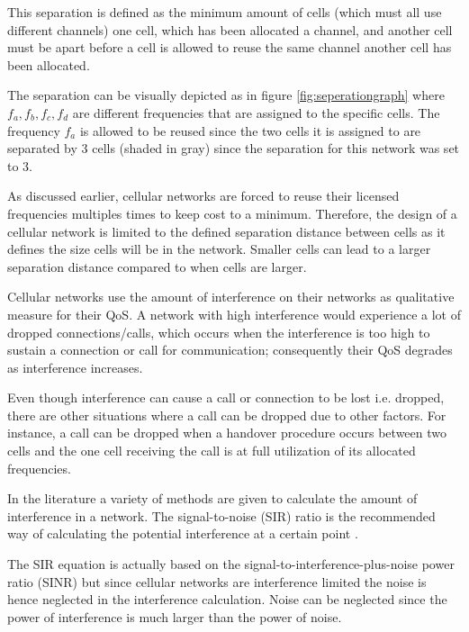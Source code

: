 This separation is defined as the minimum amount of cells (which must all use different channels) one cell, which has been allocated a channel, and another cell must be apart before a cell is allowed to reuse the same channel another cell has been allocated\cite{WirelessCommunications,WirelessDigitalCommunications,Eisenblatter,InterferenceOrientatedFAP}. 

The separation can be visually depicted as in figure \ref{fig:seperationgraph} where $f_a,f_b,f_c,f_d$ are different frequencies that are assigned to the specific cells. The frequency $f_a$ is allowed to be reused since the two cells it is assigned to are separated by 3 cells (shaded in gray) since the separation for this network was set to 3.

As discussed earlier, cellular networks are forced to reuse their licensed frequencies multiples times to keep cost to a minimum. Therefore, the design of a cellular network is limited to the defined separation distance between cells as it defines the size cells will be in the network. Smaller cells can lead to a larger separation distance compared to when cells are larger\cite{WirelessCommunications,WirelessDigitalCommunications,Eisenblatter,InterferenceOrientatedFAP}.

Cellular networks use the amount of interference on their networks as qualitative measure for their QoS. A network with high interference would experience a lot of dropped connections/calls, which occurs when the interference is too high to sustain a connection or call for communication; consequently their QoS degrades as interference increases\cite{WirelessCommunications,WirelessDigitalCommunications}.

Even though interference can cause a call or connection to be lost i.e. dropped, there are other situations where a call can be dropped due to other factors. For instance, a call can be dropped when a handover procedure occurs between two cells and the one cell receiving the call is at full utilization of its allocated frequencies\cite{GSMSysEngin,WirelessCommunications,WirelessDigitalCommunications}.

In the literature a variety of methods are given to calculate the amount of interference in a network. The signal-to-noise (SIR) ratio is the recommended way of calculating the potential interference at a certain point \cite{Karen2004}. 

The SIR equation is actually based on the signal-to-interference-plus-noise power ratio (SINR) but since cellular networks are interference limited the noise is hence neglected in the interference calculation\cite{WirelessCommunications}. Noise can be neglected since the power of interference is much larger than the power of noise\cite{WirelessCommunications,WirelessDigitalCommunications}.

